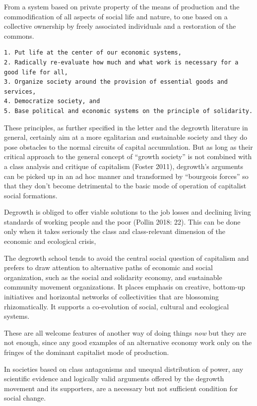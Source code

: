 \documentclass[
]{book}
\begin{document}
From a system based on private property of the means of production and the
commodification of all aspects of social life and nature, to one based on a collective ownership by freely associated individuals and a restoration of the commons.

\begin{verbatim}
1. Put life at the center of our economic systems,  
2. Radically re-evaluate how much and what work is necessary for a good life for all,  
3. Organize society around the provision of essential goods and services,
4. Democratize society, and  
5. Base political and economic systems on the principle of solidarity.   
\end{verbatim}

These principles, as further specified in the letter and the degrowth literature in general, certainly aim at a more
egalitarian and sustainable society and they do pose obstacles to the normal circuits of capital accumulation.
But as long as their critical approach to the general concept of ``growth society'' is not combined with a class
analysis and critique of capitalism (Foster 2011), degrowth's arguments can be picked up in an ad hoc manner
and transformed by ``bourgeois forces'' so that they don't become detrimental to the basic mode of operation of
capitalist social formations.

Degrowth is obliged to offer viable solutions to the job losses and declining living standards of working
people and the poor (Pollin 2018: 22). This can be done only when it takes seriously the class and class-relevant
dimension of the economic and ecological crisis,

The degrowth school tends to avoid the central social question of capitalism and prefers to
draw attention to alternative paths of economic and social organization, such as the social and solidarity
economy, and sustainable community movement organizations.
It places emphasis
on creative, bottom-up initiatives and horizontal networks of collectivities that are blossoming rhizomatically.
It supports a co-evolution of social, cultural and ecological systems.

These are all welcome features of another way of doing things \emph{now}
but they are not enough, since any good
examples of an alternative economy work only on the fringes of the dominant capitalist mode of production.

In societies based on class antagonisms and unequal distribution of power, any scientific evidence and
logically valid arguments offered by the degrowth movement and its supporters, are a necessary but not
sufficient condition for social change.
\end{document}
